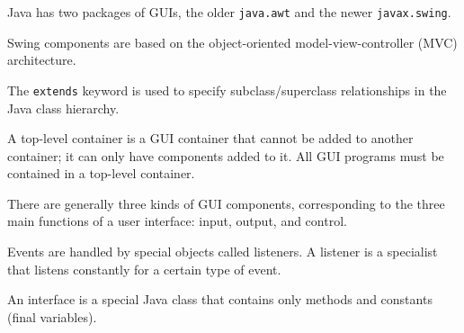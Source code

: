 \begin{SMBL}
\vspace*{6pt}
\item Java has two packages of GUIs, the older {\tt java.awt}
and the newer {\tt javax.swing}. 

\vspace*{6pt}
\item Swing components are based on the object-oriented
model-view-controller (MVC) architecture.

\vspace*{6pt}
\item The {\tt extends} keyword is used to specify subclass/superclass
relationships in the Java class hierarchy. 

\vspace*{6pt}
\item A top-level container is a GUI container that cannot be
added to another container; it can only have components added to it.
All GUI programs must be contained in a top-level container.

\vspace*{6pt}
\item There are generally three kinds of GUI components, corresponding
to the three main functions of a user interface: input, output, and
control.

\vspace*{6pt}
\item Events are handled by special objects called listeners. A
listener is a specialist that listens constantly for a certain type of
event.

\vspace*{6pt}
\item An interface is a special Java class that contains only
methods and constants (final variables).
\end{SMBL}

